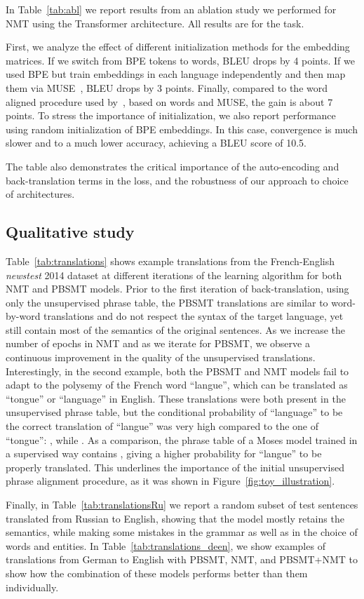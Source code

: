 \documentclass[11pt,a4paper]{article}
\begin{document}
In Table~\ref{tab:abl} we report results from an ablation study we performed for NMT using the Transformer architecture.
All results are for the  task.

First, we analyze the effect of different initialization methods for the embedding matrices. If we switch from BPE tokens to words, BLEU drops by 4 points. If we used BPE but train embeddings in each language independently and then map them via MUSE~\citep{wordalign17}, BLEU drops by 3 points. Finally, compared to the word aligned procedure used by~\citet{unsupNMTlample}, based on words and MUSE, the gain is about 7 points. To stress the importance of initialization, we also report performance using random initialization of BPE embeddings. In this case, convergence is much slower and to a much lower accuracy, achieving a BLEU score of 10.5.

The table also demonstrates the critical importance of the auto-encoding and back-translation terms in the loss, and the robustness of our approach to choice of architectures.

\insertablationtable
\inserttranslationsfren
\inserttranslationsruen
\inserttranslationsdeen

\subsection{Qualitative study}
Table~\ref{tab:translations} shows example translations from the French-English \textit{newstest} 2014 dataset at different iterations of the learning algorithm for both NMT and PBSMT models. Prior to the first iteration of back-translation, using only the unsupervised phrase table, the PBSMT translations are similar to word-by-word translations and do not respect the syntax of the target language, yet still contain most of the semantics of the original sentences. As we increase the number of epochs in NMT and as we iterate for PBSMT, we observe a continuous improvement in the quality of the unsupervised translations. Interestingly, in the second example, both the PBSMT and NMT models fail to adapt to the polysemy of the French word ``langue'', which can be translated as ``tongue'' or ``language'' in English. These translations were both present in the unsupervised phrase table, but the conditional probability of ``language'' to be the correct translation of ``langue'' was very high compared to the one of ``tongue'': , while .
As a comparison, the phrase table of a Moses model trained in a supervised way contains , giving a higher probability for ``langue'' to be properly translated.
This underlines the importance of the initial unsupervised phrase alignment procedure, as it was shown in Figure~\ref{fig:toy_illustration}.

Finally, in Table~\ref{tab:translationsRu} we report a random subset of test sentences translated from Russian to English, showing that the model mostly retains the semantics, while making some mistakes in the grammar as well as in the choice of words and entities. In Table~\ref{tab:translations_deen}, we show examples of translations from German to English with PBSMT, NMT, and PBSMT+NMT to show how the combination of these models performs better than them individually.

\clearpage
\end{document}
